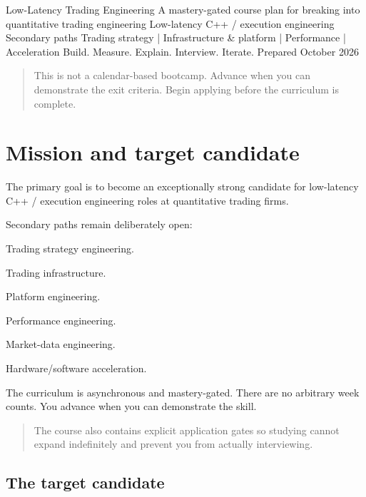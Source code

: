 \documentclass[11pt,letterpaper]{article}
\begin{document}
\coursecover
  {Low-Latency Trading Engineering}
  {A mastery-gated course plan for breaking into quantitative trading engineering}
  {Low-latency C++ / execution engineering}
  {Secondary paths}
  {Trading strategy | Infrastructure \& platform | Performance | Acceleration}
  {Build. Measure. Explain. Interview. Iterate.}
  {Prepared October 2026}

\tableofcontents
\clearpage


\begin{quote} This is not a calendar-based bootcamp. Advance when you can demonstrate the exit criteria. Begin applying before the curriculum is complete.\end{quote}

\section{Mission and target candidate}\label{sec:1}

The primary goal is to become an exceptionally strong candidate for low-latency C++ / execution engineering roles at quantitative trading firms.

Secondary paths remain deliberately open:

\begin{topics}

\item Trading strategy engineering.

\item Trading infrastructure.

\item Platform engineering.

\item Performance engineering.

\item Market-data engineering.

\item Hardware/software acceleration.

\end{topics}

The curriculum is asynchronous and mastery-gated. There are no arbitrary week counts. You advance when you can demonstrate the skill.

\begin{quote}
The course also contains explicit application gates so studying cannot expand indefinitely and prevent you from actually interviewing.
\end{quote}

\subsection*{The target candidate}
\end{document}
